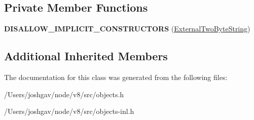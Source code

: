 \subsection*{Private Member Functions}
\begin{DoxyCompactItemize}
\item 
{\bfseries D\+I\+S\+A\+L\+L\+O\+W\+\_\+\+I\+M\+P\+L\+I\+C\+I\+T\+\_\+\+C\+O\+N\+S\+T\+R\+U\+C\+T\+O\+RS} (\hyperlink{classv8_1_1internal_1_1_external_two_byte_string}{External\+Two\+Byte\+String})\hypertarget{classv8_1_1internal_1_1_external_two_byte_string_a138b28ae5e7a3f71d49560390e2803d9}{}\label{classv8_1_1internal_1_1_external_two_byte_string_a138b28ae5e7a3f71d49560390e2803d9}

\end{DoxyCompactItemize}
\subsection*{Additional Inherited Members}


The documentation for this class was generated from the following files\+:\begin{DoxyCompactItemize}
\item 
/\+Users/joshgav/node/v8/src/objects.\+h\item 
/\+Users/joshgav/node/v8/src/objects-\/inl.\+h\end{DoxyCompactItemize}
